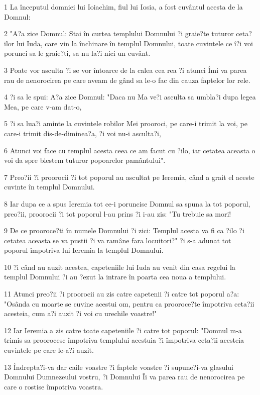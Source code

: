 \par 1 La începutul domniei lui Ioiachim, fiul lui Iosia, a fost cuvântul acesta de la Domnul:
\par 2 "A?a zice Domnul: Stai în curtea templului Domnului ?i graie?te tuturor ceta?ilor lui Iuda, care vin la închinare în templul Domnului, toate cuvintele ce î?i voi porunci sa le graie?ti, sa nu la?i nici un cuvânt.
\par 3 Poate vor asculta ?i se vor întoarce de la calea cea rea ?i atunci Îmi va parea rau de nenorocirea pe care aveam de gând sa le-o fac din cauza faptelor lor rele.
\par 4 ?i sa le spui: A?a zice Domnul: "Daca nu Ma ve?i asculta sa umbla?i dupa legea Mea, pe care v-am dat-o,
\par 5 ?i sa lua?i aminte la cuvintele robilor Mei prooroci, pe care-i trimit la voi, pe care-i trimit dis-de-diminea?a, ?i voi nu-i asculta?i,
\par 6 Atunci voi face cu templul acesta ceea ce am facut cu ?ilo, iar cetatea aceasta o voi da spre blestem tuturor popoarelor pamântului".
\par 7 Preo?ii ?i proorocii ?i tot poporul au ascultat pe Ieremia, când a grait el aceste cuvinte în templul Domnului.
\par 8 Iar dupa ce a spus Ieremia tot ce-i poruncise Domnul sa spuna la tot poporul, preo?ii, proorocii ?i tot poporul l-au prins ?i i-au zis: "Tu trebuie sa mori!
\par 9 De ce prooroce?ti în numele Domnului ?i zici: Templul acesta va fi ca ?ilo ?i cetatea aceasta se va pustii ?i va ramâne fara locuitori?" ?i s-a adunat tot poporul împotriva lui Ieremia la templul Domnului.
\par 10 ?i când au auzit acestea, capeteniile lui Iuda au venit din casa regelui la templul Domnului ?i au ?ezut la intrare în poarta cea noua a templului.
\par 11 Atunci preo?ii ?i proorocii au zis catre capetenii ?i catre tot poporul a?a: "Osânda cu moarte se cuvine acestui om, pentru ca prooroce?te împotriva ceta?ii acesteia, cum a?i auzit ?i voi cu urechile voastre!"
\par 12 Iar Ieremia a zis catre toate capeteniile ?i catre tot poporul: "Domnul m-a trimis sa proorocesc împotriva templului acestuia ?i împotriva ceta?ii acesteia cuvintele pe care le-a?i auzit.
\par 13 Îndrepta?i-va dar caile voastre ?i faptele voastre ?i supune?i-va glasului Domnului Dumnezeului vostru, ?i Domnului Îi va parea rau de nenorocirea pe care o rostise împotriva voastra.
